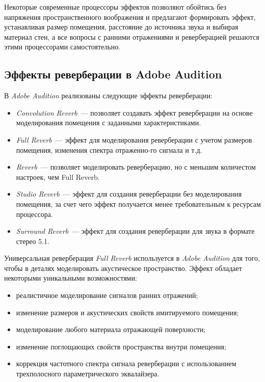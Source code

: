 \documentclass[oneside, final, 14pt]{extreport}
\begin{document}
Некоторые современные процессоры эффектов позволяют обойтись без напряжения пространственного воображения и предлагают формировать эффект, устанавливая размер помещения, расстояние до источника звука и выбирая материал стен, а все вопросы с ранними отражениями и реверберацией решаются этими процессорами самостоятельно.

\subsection{Эффекты реверберации в Adobe Audition}
В \emph{Adobe Audition} реализованы следующие эффекты реверберации:
\begin{itemize}
  \item \emph{Convolution Reverb}~--- позволяет создавать эффект реверберации на основе моделирования помещения с заданными характеристиками.
  \item \emph{Full Reverb}~--- эффект для моделирования реверберации с учетом размеров помещения, изменения спектра отраженно-го сигнала и т.д.
  \item \emph{Reverb}~--- позволяет моделировать реверберацию, но с меньшим количестом настроек, чем Full Reverb.
  \item \emph{Studio Reverb}~--- эффект для создания реверберации без моделирования помещения, за счет чего эффект получается менее требовательным к ресурсам процессора.
  \item \emph{Surround Reverb}~--- эффект для создания реверберации для звука в формате стерео 5.1.
\end{itemize}

Универсальная реверберация \emph{Full Reverb} используется в \emph{Adobe Audition} для того, чтобы в деталях моделировать акустическое пространство. Эффект обладает некоторыми уникальными возможностями:
\begin{itemize}
  \item реалистичное моделирование сигналов ранних отражений;
  \item изменение размеров и акустических свойств имитируемого помещения;
  \item моделирование любого материала отражающей поверхности;
  \item изменение поглощающих свойств пространства внутри помещения;
  \item коррекция частотного спектра сигнала реверберации с использованием трехполосного параметрического эквалайзера.
\end{itemize}
\end{document}
